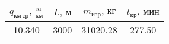 \begin{tabular}{|c|c|c|c|}
\hline
$q_{км\, ср},\, \frac{кг}{км}$ & $L,\, м$ & $m_{изр},\, кг$ & $t_{кр},\, мин$ \\ 
\hline
10.340 & 3000 & 31020.28 & 277.50 \\ 
\hline
\end{tabular}